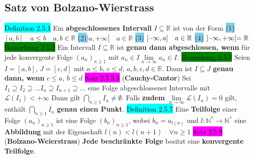 \documentclass[landscape, 10pt]{article}
\newcommand{\R}{\mathbb{R}}
\newcommand{\N}{\mathbb{N}}
\begin{document}
\begin{multicols}{3}
\subsection{Satz von Bolzano-Wierstrass}
\colorbox{cyan}{Definition 2.5.1} Ein \textbf{abgeschlossenes Intervall} 
                $I\subseteq\R$ ist von der Form
        \colorbox{SkyBlue}{(1)} 
                $[a,b]\quad a\leqslant b\quad a,b\in\R$\quad\enspace 
                \colorbox{SkyBlue}{(2)}$[a,+\infty[\quad a\in\R$\quad\enspace
                \colorbox{SkyBlue}{(3)}
                $]\scalebox{0.75}[1.0]{\(-\)}\infty,a]\quad a\in\R$\quad\enspace
                \colorbox{SkyBlue}{(4)} 
                $]\scalebox{0.75}[1.0]{\(-\)}\infty,+\infty[=\R$
\colorbox{green}{Bemerkung 2.5.2} Ein Intervall $I\subseteq\R$ ist \textbf{genau dann 
                abgeschlossen, wenn} für jede konvergente Folge $(a_n)_{n\geqslant1}$ 
         mit \textcolor{NavyBlue}{$a_n\in I$\quad$\lim\limits_{n\to\infty}a_n\in I$}.
\colorbox{green}{Bemerkung 2.5.3} Seien $I=[a,b],\,J=[c,d]$ mit 
                \textcolor{NavyBlue}{$a\leqslant b,\,c\leqslant d,\,a,b,c,d\in\R$}. 
                Dann ist 
                \textcolor{NavyBlue}{$I\subseteq J$} \textbf{genau dann, 
         wenn} \textcolor{NavyBlue}{$c\leqslant a,\,b\leqslant d$}
\colorbox{magenta}{Satz 2.5.5.5} (\textbf{Cauchy-Cantor}) Sei 
                \textcolor{NavyBlue}{
                $I_1\supseteq I_2\supseteq ...I_n\supseteq I_{n+1}\supseteq ...$} eine Folge 
                abgeschlossener Intervalle mit 
         \textcolor{NavyBlue}{$\mathcal{L}(I_1)<+\infty$} Dann gilt 
                \textcolor{NavyBlue}{$\bigcap_{n\geqslant1}I_n\neq\emptyset$}. 
                Falls \textbf{zudem}  
                \textcolor{NavyBlue}{$\lim\limits_{n\to\infty}\mathcal{L}(I_n)=0$} 
                gilt, enthält 
                \textcolor{NavyBlue}{$\bigcap_{n\geqslant1}I_n$} 
                \textbf{genau einen Punkt}.
\colorbox{cyan}{Definition 2.5.7} Eine \textbf{Teilfolge} einer Folge 
                \textcolor{NavyBlue}{$(a_n)_{n\geqslant1}$}
                ist eine Folge 
                \textcolor{NavyBlue}{$(b_n)_{n\geqslant1}$}, wobei 
                \textcolor{NavyBlue}{$b_n=a_{l(n)}$} und 
                \textcolor{NavyBlue}{$l:\N^{*}\longrightarrow\N^*$} 
         eine \textbf{Abbildung} mit der Eigenschaft 
                \textcolor{NavyBlue}{$l(n)<l(n+1)\quad\forall n\geqslant1$}
\colorbox{magenta}{Satz 2.5.9} (\textbf{Bolzano-Weierstrass}) \textbf{Jede beschränkte Folge} 
                besitzt eine \textbf{konvergente Teilfolge}.

\end{multicols}
\end{document}
